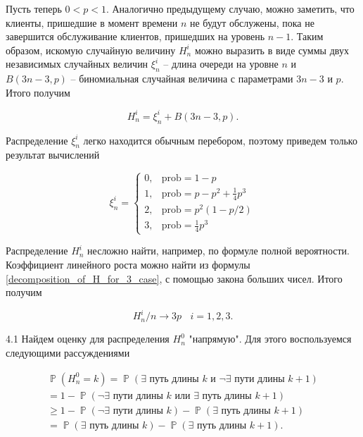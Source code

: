 \documentclass[10pt, reqno]{amsart}
\DeclareMathOperator*{\Pb}{\mathbb{P}}
\begin{document}
  Пусть теперь $0 < p < 1$. Аналогично предыдущему случаю, можно заметить, что клиенты, пришедшие в момент времени $n$ не будут обслужены, пока не завершится обслуживание клиентов, пришедших на уровень $n-1$. Таким образом, искомую случайную величину $H_{n}^{i}$ можно выразить в виде суммы двух независимых случайных величин $\xi_{n}^{i}$ -- длина очереди на уровне $n$ и $B(3n-3, p)$ -- биномиальная случайная величина с параметрами $3n-3$ и $p$. Итого получим
  
  \begin{equation}
      H_{n}^{i} = \xi_{n}^{i} + B(3n-3, p).
      \label{decomposition_of_H_for_3_case}
  \end{equation}
  
  Распределение $\xi_{n}^{i}$ легко находится обычным перебором, поэтому приведем только результат вычислений
  
  \begin{equation}
      \xi_{n}^{i} = \begin{cases}
      0, & \text{prob} = 1-p \\
      1, & \text{prob} = p - p^{2} + \frac{1}{4}p^{3} \\
      2, & \text{prob} = p^{2}(1-p/2) \\
      3, & \text{prob} = \frac{1}{4}p^{3}
      \end{cases}
  \end{equation}
  
  Распределение $H_{n}^{i}$ несложно найти, например, по формуле полной вероятности. Коэффициент линейного роста можно найти из формулы \ref{decomposition_of_H_for_3_case}, с помощью закона больших чисел. Итого получим
  
  \begin{equation}
      H_{n}^{i}/n \xrightarrow{} 3p \:\:\:\: i = 1,2,3.
  \end{equation}
  
  4.1 Найдем оценку для распределения $H_{n}^{0}$ "напрямую". Для этого воспользуемся следующими рассуждениями
  
  \begin{align*}
    \Pb(H_{n}^{0} = k) = \Pb(\exists \text{ путь длины } k \text{ и } \neg\exists \text{ пути длины } k+1) \\ = 1 - \Pb(\neg\exists \text{ пути длины } k \text{ или } \exists \text{ путь длины } k+1) \\ \geq 1 - \Pb(\neg\exists \text{ пути длины } k) - \Pb(\exists \text{ путь длины } k+1) \\ = \Pb(\exists \text{ путь длины } k) - \Pb(\exists \text{ путь длины } k+1).
  \end{align*}
  
\end{document}
